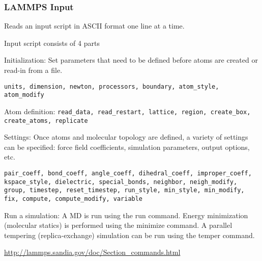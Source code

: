 \documentclass[slidestop,mathserif,compress,xcolor=svgnames]{beamer}
\begin{document}
\begin{frame}
\frametitle{\footnotesize LAMMPS Input}
\begin{itemize}
{\scriptsize
\item Reads an input script in ASCII format one line at a time.
\item Input script consists of 4 parts
\begin{enumerate}
{\scriptsize
\item Initialization: Set parameters that need to be defined before atoms are created or read-in from a file.
\item[] \texttt{units, dimension, newton, processors, boundary, atom\_style, atom\_modify}
\item Atom definition: \texttt{read\_data, read\_restart, lattice, region, create\_box, create\_atoms, replicate}
\item Settings: Once atoms and molecular topology are defined, a variety of settings can be specified: force field coefficients, simulation parameters, output options, etc. 
\item[] \texttt{pair\_coeff, bond\_coeff, angle\_coeff, dihedral\_coeff, improper\_coeff, kspace\_style, dielectric, special\_bonds, neighbor, neigh\_modify, group, timestep, reset\_timestep, run\_style, min\_style, min\_modify, fix, compute, compute\_modify, variable}
\item Run a simulation: A MD is run using the run command. Energy minimization (molecular statics) is performed using the minimize command. A parallel tempering (replica-exchange) simulation can be run using the temper command.
}
\end{enumerate}
\item \url{http://lammps.sandia.gov/doc/Section_commands.html}
}
\end{itemize}
\end{frame}
\end{document}
